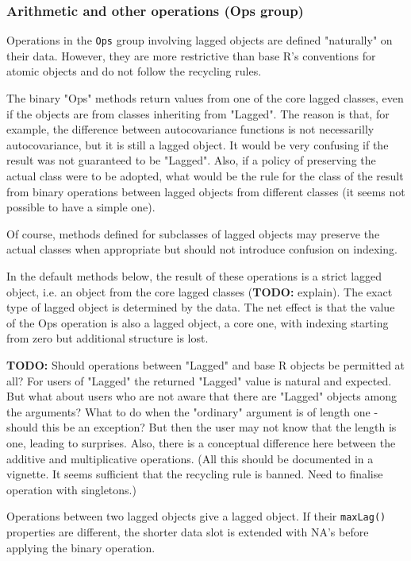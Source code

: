 \documentclass[11pt,a4paper]{article}
\begin{document}
\subsubsection{Arithmetic and other operations (Ops group)}
\label{sec:org86c31c2}

Operations in the \texttt{Ops} group involving lagged objects are defined "naturally" on their
data. However, they are more restrictive than base R's conventions for atomic objects and do
not follow the recycling rules.

The binary "Ops" methods return values from one of the core lagged classes, even if the
objects are from classes inheriting from "Lagged". The reason is that, for example, the
difference between autocovariance functions is not necessarilly autocovariance, but it is
still a lagged object. It would be very confusing if the result was not guaranteed to be
"Lagged".  Also, if a policy of preserving the actual class were to be adopted, what would
be the rule for the class of the result from binary operations between lagged objects from
different classes (it seems not possible to have a simple one). 


Of course, methods defined for subclasses of lagged objects may preserve the actual classes
when appropriate but should not introduce confusion on indexing.

In the default methods below, the result of these operations is a strict lagged object,
i.e. an object from the core lagged classes (\textbf{TODO:} explain). The exact type of lagged
object is determined by the data. The net effect is that the value of the Ops operation is
also a lagged object, a core one, with indexing starting from zero but additional structure
is lost.


\textbf{TODO:} Should operations between "Lagged" and base R objects be permitted at all?  For users
of "Lagged" the returned "Lagged" value is natural and expected. But what about users who are
not aware that there are "Lagged" objects among the arguments? What to do when the "ordinary"
argument is of length one - should this be an exception? But then the user may not know that
the length is one, leading to surprises. Also, there is a conceptual difference here between
the additive and multiplicative operations. (All this should be documented in a vignette. It
seems sufficient that the recycling rule is banned. Need to finalise operation with
singletons.)


Operations between two lagged objects give a lagged object. If their \texttt{maxLag()} properties
are different, the shorter data slot is extended with NA's before applying the binary
operation.
\end{document}
